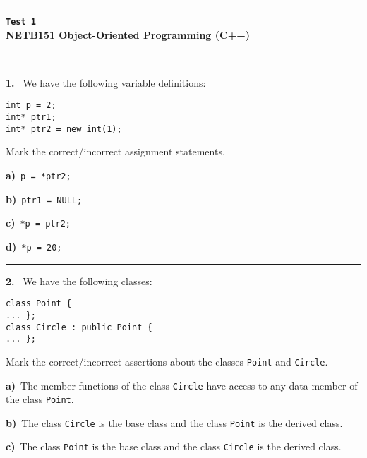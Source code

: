\newpage\thispagestyle{empty}\par 
\hrule 
\begin{center}
{\bf\large {}}\hfill {\bf\large\verb|Test 1|}
 \hfill{\bf\large {}}\\ 
{\bf\large NETB151 Object-Oriented Programming (C++)}\\[4pt]
{\bf \large {}}\\ 
\end{center}\par
 \vspace{-4mm}
\begin{multicols}{2}
\par\smallskip\hrule\par\medskip

{\bf 1. }\ We have the following variable definitions:
 \vspace{-3mm}\begin{verbatim}
int p = 2;
int* ptr1;
int* ptr2 = new int(1);
 \end{verbatim}\vspace{-6mm}
Mark the correct/incorrect assignment statements.

{\bf a)}\ \verb|p = *ptr2;|

{\bf b)}\ \verb|ptr1 = NULL;|

{\bf c)}\ \verb|*p = ptr2;|

{\bf d)}\ \verb|*p = 20;|

\par\smallskip\hrule\par\medskip

{\bf 2. }\ We have the following classes:
 \vspace{-3mm}\begin{verbatim}
class Point {
... };
class Circle : public Point {
... };
 \end{verbatim}\vspace{-6mm}
Mark the correct/incorrect assertions about the classes
\verb|Point| and \verb|Circle|.

{\bf a)}\ The member functions of the class \verb|Circle| have access to any data member of the class \verb|Point|.

{\bf b)}\ The class \verb|Circle| is the base class and the class \verb|Point| is the derived class.

{\bf c)}\ The class \verb|Point| is the base class and the class \verb|Circle| is the derived class.


\end{multicols}
